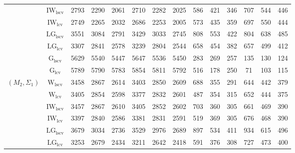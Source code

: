 \begin{table}[!ht]
{\begin{tabular}{@{}cc|ccc|ccc|ccc|ccc@{}}
 & $\mathrm{IW}_{\mathrm{lscv}}$ & \cellcolor{black!10}2793 & \cellcolor{black!10}2290 & \cellcolor{black!10}2061 & \cellcolor{black!10}2710 & \cellcolor{black!10}2282 & \cellcolor{black!10}2025 & 586 & 421 & 346 & 707 & 544 & 446 \\ 
 & $\mathrm{IW}_{\mathrm{lcv}}$ & \cellcolor{black!30}2749 & \cellcolor{black!30}2265 & \cellcolor{black!30}2032 & \cellcolor{black!30}2686 & \cellcolor{black!30}2253 & \cellcolor{black!30}2005 & 573 & 435 & 359 & 697 & 550 & 444 \\ 
 & $\mathrm{LG}_{\mathrm{lscv}}$ & 3551 & 3084 & 2791 & 3429 & 3033 & 2745 & 808 & 553 & 422 & 804 & 638 & 485 \\ 
 & $\mathrm{LG}_{\mathrm{lcv}}$ & 3307 & 2841 & 2578 & 3239 & 2804 & 2544 & 658 & 454 & 382 & 657 & 499 & 412 \\ 
 & $\mathrm{G}_{\mathrm{lscv}}$ & 5629 & 5540 & 5447 & 5647 & 5536 & 5450 & \cellcolor{black!30}283 & \cellcolor{black!10}269 & \cellcolor{black!10}257 & \cellcolor{black!10}135 & \cellcolor{black!10}130 & \cellcolor{black!10}124 \\ 
 & $\mathrm{G}_{\mathrm{lcv}}$ & 5789 & 5790 & 5783 & 5854 & 5811 & 5792 & \cellcolor{black!10}516 & \cellcolor{black!30}178 & \cellcolor{black!30}250 & \cellcolor{black!30}71 & \cellcolor{black!30}103 & \cellcolor{black!30}115 \\ 
\midrule
$(M_2,\Sigma_1)$ & $\mathrm{W}_{\mathrm{lscv}}$ & 3458 & 2867 & 2614 & 3403 & 2850 & 2609 & 688 & 355 & \cellcolor{black!10}291 & 644 & \cellcolor{black!10}442 & 379 \\ 
 & $\mathrm{W}_{\mathrm{lcv}}$ & 3405 & 2854 & 2598 & \cellcolor{black!10}3377 & 2832 & 2601 & \cellcolor{black!10}487 & \cellcolor{black!10}354 & 315 & 652 & 444 & \cellcolor{black!10}375 \\ 
 & $\mathrm{IW}_{\mathrm{lscv}}$ & 3457 & 2867 & 2610 & 3405 & 2852 & 2602 & 703 & 360 & 305 & 661 & 469 & 390 \\ 
 & $\mathrm{IW}_{\mathrm{lcv}}$ & \cellcolor{black!10}3397 & \cellcolor{black!10}2840 & \cellcolor{black!10}2586 & 3381 & \cellcolor{black!10}2831 & \cellcolor{black!10}2591 & 519 & 369 & 305 & 676 & 468 & 390 \\ 
 & $\mathrm{LG}_{\mathrm{lscv}}$ & 3679 & 3034 & 2736 & 3529 & 2976 & 2689 & 897 & 534 & 411 & 934 & 615 & 496 \\ 
 & $\mathrm{LG}_{\mathrm{lcv}}$ & \cellcolor{black!30}3253 & \cellcolor{black!30}2679 & \cellcolor{black!30}2434 & \cellcolor{black!30}3211 & \cellcolor{black!30}2642 & \cellcolor{black!30}2418 & 591 & 376 & 308 & 727 & 473 & 400 \\ 

\end{tabular}}
\end{table}
